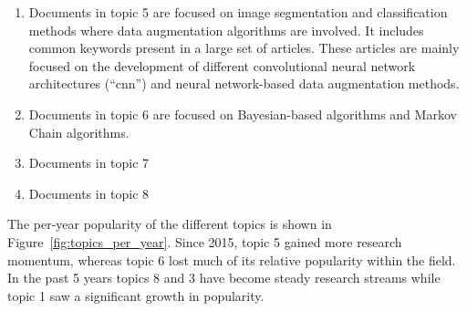 \documentclass[parskip=full]{scrartcl}
\begin{document}
\begin{enumerate}
    \item Documents in topic 5 are focused on image segmentation
        and classification methods where data augmentation algorithms are
        involved. It includes common keywords present in a large set of
        articles. These articles are mainly focused on the development of
        different convolutional neural network architectures (``cnn'') and
        neural network-based data augmentation methods.

    \item Documents in topic 6 are focused on Bayesian-based algorithms and
        Markov Chain algorithms.

    \item Documents in topic 7 

    \item Documents in topic 8

\end{enumerate}

\begin{table}[H]
    \centering
    \vspace{.2cm}
    \caption{\label{tab:topic_analysis}
        Description of the main topics found in the literature.
    }
\end{table}

The per-year popularity of the different topics is shown in
Figure~\ref{fig:topics_per_year}. Since 2015, topic 5 gained more research
momentum, whereas topic 6 lost much of its relative popularity within the
field. In the past 5 years topics 8 and 3 have become steady research streams
while topic 1 saw a significant growth in popularity. 
\end{document}
